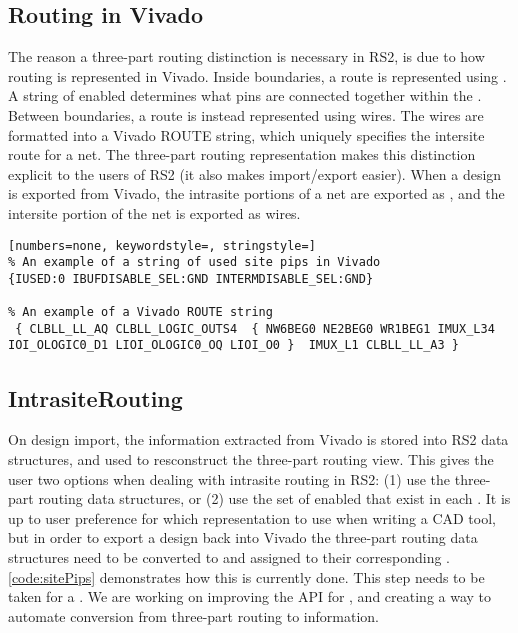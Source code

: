 \subsection{Routing in Vivado}
The reason a three-part routing distinction is necessary in RS2, is due
to how routing is represented in Vivado. Inside \site boundaries, a route is
represented using \site \pips. A string of enabled \pips determines what pins
are connected together within the \site. Between \site boundaries, a route is
instead represented using wires. The wires are formatted into a Vivado ROUTE
string, which uniquely specifies the intersite route for a net. The three-part
routing representation makes this distinction explicit to the users of
RS2 (it also makes import/export easier). When a design is exported from
Vivado, the intrasite portions of a net are exported as \site \pips, and the
intersite portion of the net is exported as wires.

\begin{lstlisting}[numbers=none, keywordstyle=, stringstyle=]
% An example of a string of used site pips in Vivado
{IUSED:0 IBUFDISABLE_SEL:GND INTERMDISABLE_SEL:GND}

% An example of a Vivado ROUTE string
 { CLBLL_LL_AQ CLBLL_LOGIC_OUTS4  { NW6BEG0 NE2BEG0 WR1BEG1 IMUX_L34
IOI_OLOGIC0_D1 LIOI_OLOGIC0_OQ LIOI_O0 }  IMUX_L1 CLBLL_LL_A3 }  
\end{lstlisting}

\subsection{IntrasiteRouting}
On design import, the \site \pip information extracted from Vivado is stored
into RS2 data structures, and used to resconstruct the three-part
routing view. This gives the user two options when dealing with intrasite
routing in RS2: (1) use the three-part routing data structures, or (2)
use the set of enabled \site \pips that exist in each \site. It is up to user
preference for which representation to use when writing a CAD tool, but in
order to export a design back into Vivado the three-part routing data
structures need to be converted to \site \pips and assigned to their
corresponding \site. \autoref{code:sitePips} demonstrates how this is
currently done. This step needs to be taken  for a \site. We are working on improving the API for \site
\pips, and creating a way to automate conversion from three-part routing to
\site \pip information.

